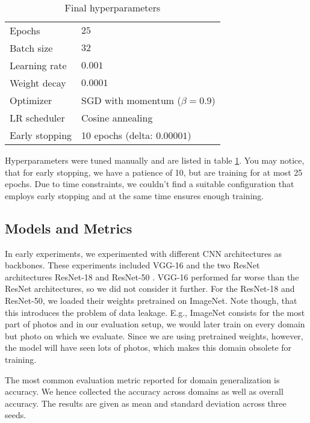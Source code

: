 \begin{table}
    \centering
    \caption{Final hyperparameters}
    \begin{tabular}{l l}
        \toprule
        Epochs & $25$ \\
        Batch size & $32$ \\
        Learning rate & $0.001$ \\
        Weight decay & $0.0001$ \\
        Optimizer & SGD with momentum ($\beta = 0.9$) \\
        LR scheduler & Cosine annealing \\
        Early stopping & 10 epochs (delta: $0.00001$) \\
        \bottomrule
    \end{tabular}
    \label{tab:hyperparameters}
\end{table}

Hyperparameters were tuned manually and are listed in table \ref{tab:hyperparameters}. You may notice, that for early stopping, we have a patience of 10, but are training for at most 25 epochs. Due to time constraints, we couldn't find a suitable configuration that employs early stopping and at the same time ensures enough training.

\subsection{Models and Metrics}

In early experiments, we experimented with different CNN architectures as backbones. These experiments included VGG-16 \citep{vgg-16_ref} and the two ResNet architectures ResNet-18 and ResNet-50 \citep{resnet_ref}. VGG-16 performed far worse than the ResNet architectures, so we did not consider it further. For the ResNet-18 and ResNet-50, we loaded their weights pretrained on ImageNet. Note though, that this introduces the problem of data leakage. E.g., ImageNet consists for the most part of photos and in our evaluation setup, we would later train on every domain but photo on which we evaluate. Since we are using pretrained weights, however, the model will have seen lots of photos, which makes this domain obsolete for training.

The most common evaluation metric reported for domain generalization is accuracy. We hence collected the accuracy across domains as well as overall accuracy. The results are given as mean and standard deviation across three seeds.